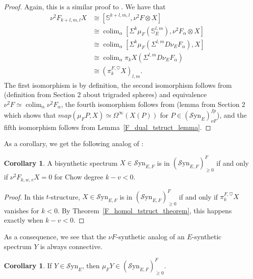 \documentclass[10pt]{amsart}
\theoremstyle{definition}
\numberwithin{figure}{section}
\numberwithin{equation}{section}
\newtheorem{corollary}[figure]{Corollary}
\theoremstyle{cited}
\newcommand{\bS}{\mathbb{S}}
\newcommand{\colim}{\operatorname{colim}}
\newcommand{\Syn}{\mathcal{S}\mathrm{yn}}
\begin{document}
  \begin{proof}
      Again, this is a similar proof to \cite[Thm. 4.18]{Pst22}. We have that
      \begin{equation*}
       \begin{aligned}
        \nu^2F_{k+l,m,l}X&\cong [\bS^{k+l,m,l},\nu^2F\otimes X] \\
        &\cong \colim_\alpha[\Sigma^k\mu_F(\bS^{l,m}_E),\nu^2F_\alpha\otimes X] \\
        &\cong \colim_\alpha [\Sigma^k\mu_F(\Sigma^{l,m}D\nu_EF_\alpha),X] \\
        &\cong \colim_\alpha \pi_kX(\Sigma^{l,m}D\nu_EF_\alpha) \\
        &\cong (\pi_k^{F,\heartsuit}X)_{l,m}.
      \end{aligned}   
      \end{equation*}
   The first isomorphism is by definition, the second isomorphism follows from (definition from Section 2 about trigraded spheres) and equivalence $\nu^2F\simeq\colim_\alpha \nu^2F_\alpha$, the fourth isomorphism follows from (lemma from Section 2 which shows that $map(\mu_FP,X)\simeq \Omega^\infty(X(P))$ for $P\in(\Syn_E)_{\nu F}^{fp}$), and the fifth isomorphism follows from Lemma~\ref{F_dual_tstruct_lemma}.   
  \end{proof}
  
  As a corollary, we get the following analog of \cite[Cor. 4.19]{Pst22}:
  
  \begin{corollary}
  \label{F_chow_degree_cor}
  A bisynthetic spectrum $X\in\Syn_{E,F}$ is in $(\Syn_{E,F})_{\geq 0}^F$ if and only if $\nu^2F_{k,w,v}X =0$ for Chow degree $k-v<0$. 
  \end{corollary}
  
  \begin{proof}
      In this $t$-structure, $X\in\Syn_{E,F}$ is in $(\Syn_{E,F})_{\geq 0}^F$ if and only if $\pi_k^{F,\heartsuit}X$ vanishes for $k<0$. By Theorem~\ref{F_homol_tstruct_theorem}, this happens exactly when $k-v<0$.
  \end{proof}
  
As a consequence, we see that the $\nu F$-synthetic analog of an $E$-synthetic spectrum $Y$ is always connective.
  
  \begin{corollary}
      If $Y\in\Syn_E$, then $\mu_F Y\in (\Syn_{E,F})_{\geq 0}^F$.
  \end{corollary}
  
\end{document}
